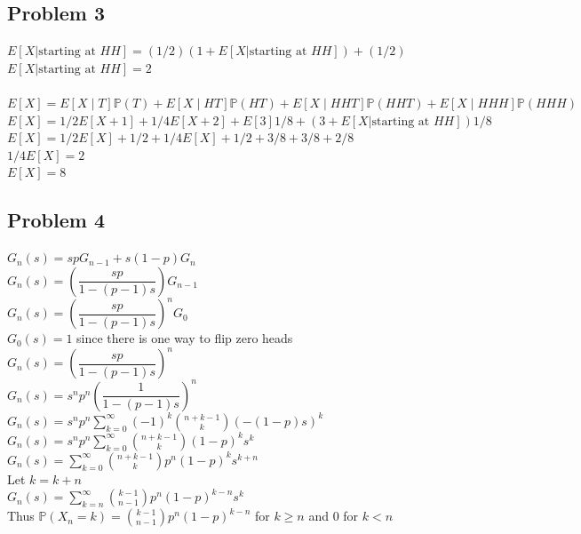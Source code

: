 \documentclass[12pt, letterpaper]{article}
\theoremstyle{definition}
\renewcommand{\P}{\mathbb{P}}
\renewcommand{\t}[1]{\text{#1}}
\begin{document}
\newpage
\subsection*{Problem 3}
$E[X | \t{starting at } HH]=(1/2)(1+E[X | \t{starting at } HH])+(1/2)$\\
$E[X | \t{starting at } HH]=2$\\
\phantom{te}\\
$E[X]=E[X \mid T]\P(T)+E[X \mid HT]\P(HT)+E[X \mid HHT]\P(HHT)+E[X \mid HHH]\P(HHH)$\\
$E[X]=1/2E[X+1]+1/4E[X+2]+E[3]1/8+(3+E[X | \t{starting at } HH])1/8$\\
$E[X]=1/2E[X]+1/2+1/4E[X]+1/2+3/8+3/8+2/8$\\
$1/4E[X]=2$\\
$E[X]=8$

\newpage
\subsection*{Problem 4}
$G_n(s)=spG_{n-1}+s(1-p)G_{n}$\\
$G_n(s)=\left( \dfrac{sp}{1-(p-1)s} \right)G_{n-1}$\\
$G_n(s)=\left( \dfrac{sp}{1-(p-1)s} \right)^nG_{0}$\\
$G_0(s)=1$ since there is one way to flip zero heads\\
$G_n(s)=\left( \dfrac{sp}{1-(p-1)s} \right)^n$\\
$G_n(s)=s^np^n\left( \dfrac{1}{1-(p-1)s} \right)^n$\\
$G_n(s)=s^np^n\sum\limits_{k=0}^\infty(-1)^k\binom{n+k-1}{k}(-(1-p)s)^k$\\
$G_n(s)=s^np^n\sum\limits_{k=0}^\infty\binom{n+k-1}{k}(1-p)^ks^k$\\
$G_n(s)=\sum\limits_{k=0}^\infty\binom{n+k-1}{k}p^n(1-p)^ks^{k+n}$\\
Let $k=k+n$\\
$G_n(s)=\sum\limits_{k=n}^\infty\binom{k-1}{n-1}p^n(1-p)^{k-n}s^{k}$\\
Thus $\P(X_n=k)=\binom{k-1}{n-1}p^n(1-p)^{k-n}$ for $k \geq n$ and $0$ for $k < n$
\end{document}
